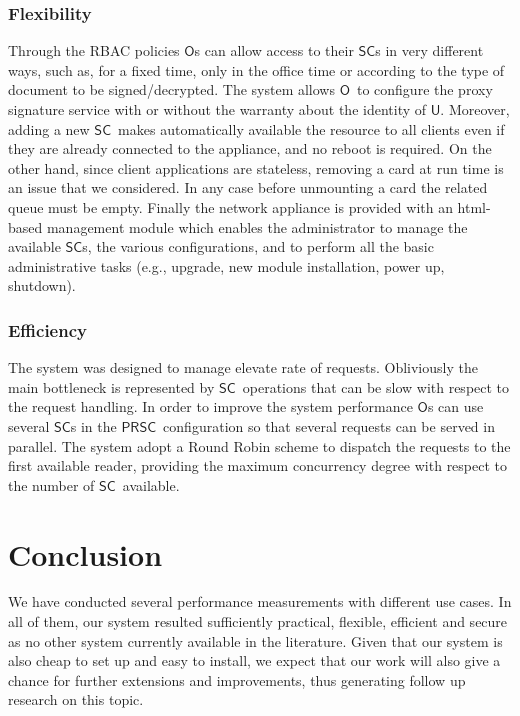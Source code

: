 \documentclass{sig-alternate}
\newcommand{\Owner}{\ensuremath{\mathsf{O}}}
\newcommand{\User}{\ensuremath{\mathsf{U}}}
\newcommand{\SC}{\ensuremath{\mathsf{SC}}}
\newcommand{\PRSC}{\ensuremath{\mathsf{PRSC}}}
\begin{document}
\subsubsection{Flexibility}
Through the RBAC policies \Owner s can allow access to their \SC s in very different ways, such as, for a fixed time, only in the office time or according to the type of document to be signed/decrypted. The system allows \Owner\ to configure the proxy signature service with or without the warranty about the identity of  \User . Moreover,  adding a new \SC\  makes automatically available the resource to all clients even if they are already connected to the appliance, and no reboot is required. On the other hand, since client applications are stateless, removing a card at run time is an issue that we considered. In any case before unmounting a card the related queue must be empty. Finally the network appliance is provided with an html-based management module which enables the administrator to manage the available \SC s, the various configurations, and to perform all the basic administrative tasks (e.g., upgrade, new module installation, power up, shutdown).


\subsubsection{Efficiency}
The system was designed to manage elevate rate of requests. Obliviously the main bottleneck is represented by \SC\ operations that can be slow with respect to the request handling. In order to improve the system performance \Owner s can use several \SC s in the \PRSC\  configuration so that several requests can be served in parallel. The system adopt a Round Robin scheme to dispatch the requests to the first available reader, providing the maximum concurrency degree with respect to the number of \SC\  available.


\section{Conclusion}
We have conducted several performance measurements with different use cases. In all of them, our system resulted sufficiently practical, flexible, efficient and secure
as no other system currently available in the literature. Given that our system is also cheap to set up and easy to install, we expect that our work will also give
a chance for further extensions and improvements, thus generating follow up research on this topic.
\end{document}
